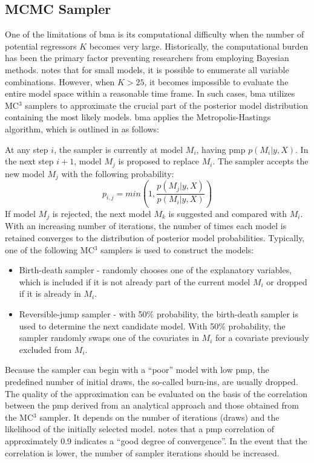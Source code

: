 \documentclass[a4paper,11pt]{article}
\begin{document}
\subsection*{MCMC Sampler}
\label{sec:mc3}
One of the limitations of \ac{bma} is its computational difficulty when the number of potential regressors $K$ becomes very large. Historically, the computational burden has been the primary factor preventing researchers from employing Bayesian methods. \citet{Zeugner2011} notes that for small models, it is possible to enumerate all variable combinations. However, when $K > 25$, it becomes impossible to evaluate the entire model space within a reasonable time frame. In such cases, \ac{bma} utilizes MC$^{3}$ samplers to approximate the crucial part of the posterior model distribution containing the most likely models. \ac{bma} applies the Metropolis-Hastings algorithm, which is outlined in \citet{Zeugner2011} as follows:

At any step $i$, the sampler is currently at model $M_{i}$, having \ac{pmp} $p(M_{i} \vert y,X)$. In the next step $i+1$, model $M_{j}$ is proposed to replace $M_{i}$. The sampler accepts the new model $M_{j}$ with the following probability:
\begin{equation}\label{eq:sampler}
p_{i,j} = min \left( 1, \frac{p(M_{j} \vert y,X)}{p(M_{i} \vert y,X)}\right)
\end{equation}
If model $M_{j}$ is rejected, the next model $M_{k}$ is suggested and compared with $M_{i}$. With an increasing number of iterations, the number of times each model is retained converges to the distribution of posterior model probabilities. Typically, one of the following MC$^{3}$ samplers is used to construct the models:
%
\begin{itemize}
	\item{Birth-death sampler - randomly chooses one of the explanatory variables, which is included if it is not already part of the current model $M_{i}$ or dropped if it is already in $M_{i}$.}
	\item{Reversible-jump sampler - with 50\% probability, the birth-death sampler is used to determine the next candidate model. With 50\% probability, the sampler randomly swaps one of the covariates in $M_{i}$ for a covariate previously excluded from $M_{i}$.}
\end{itemize}
%
Because the sampler can begin with a ``poor'' model with low \ac{pmp}, the predefined number of initial draws, the so-called burn-ins, are usually dropped. The quality of the approximation can be evaluated on the basis of the correlation between the \ac{pmp} derived from an analytical approach and those obtained from the MC$^{3}$ sampler. It depends on the number of iterations (draws) and the likelihood of the initially selected model. \citet{Zeugner2011} notes that a \ac{pmp} correlation of approximately 0.9 indicates a ``good degree of convergence''. In the event that the correlation is lower, the number of sampler iterations should be increased.
\end{document}
